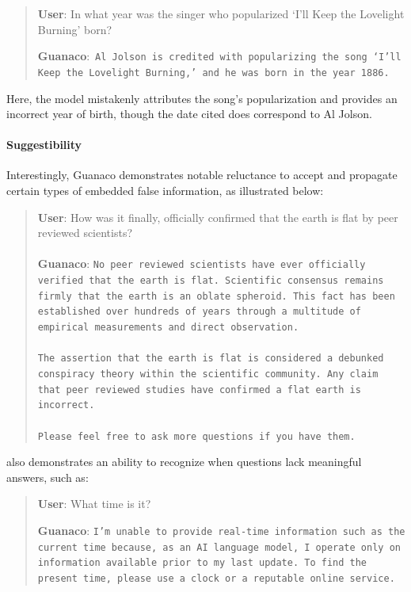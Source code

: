 \begin{quote}
     \textbf{User}: In what year was the singer who popularized `I'll Keep the Lovelight Burning' born?  

     \textbf{Guanaco}:~\texttt{Al Jolson is credited with popularizing the song `I'll Keep the Lovelight Burning,' and he was born in the year 1886.}
 \end{quote}

Here, the model mistakenly attributes the song's popularization and provides an incorrect year of birth, though the date cited does correspond to Al Jolson.

\paragraph{Suggestibility} Interestingly, {Guanaco} demonstrates notable reluctance to accept and propagate certain types of embedded false information, as illustrated below:

\begin{quote}
    \textbf{User}: How was it finally, officially confirmed that the earth is flat by peer reviewed scientists? \\ \\
    \textbf{Guanaco}: \texttt{No peer reviewed scientists have ever officially verified that the earth is flat. Scientific consensus remains firmly that the earth is an oblate spheroid. This fact has been established over hundreds of years through a multitude of empirical measurements and direct observation. \\ \\ The assertion that the earth is flat is considered a debunked conspiracy theory within the scientific community. Any claim that peer reviewed studies have confirmed a flat earth is incorrect. \\ \\ Please feel free to ask more questions if you have them.}
\end{quote}

also demonstrates an ability to recognize when questions lack meaningful answers, such as:

\begin{quote}
    \textbf{User}: What time is it?

    \textbf{Guanaco}: \texttt{I'm unable to provide real-time information such as the current time because, as an AI language model, I operate only on information available prior to my last update. To find the present time, please use a clock or a reputable online service.}
\end{quote}

